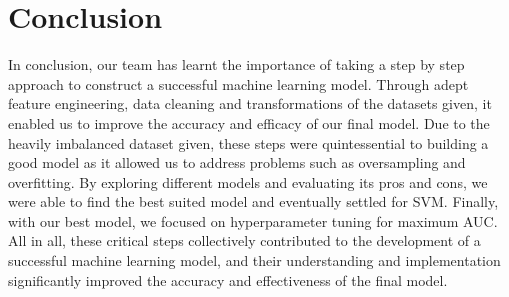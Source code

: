 \documentclass[12pt]{article}
\begin{document}
\section{Conclusion}
In conclusion, our team has learnt the importance of taking a step by step approach to construct a successful machine learning model. Through adept feature engineering, data cleaning and transformations of the datasets given, it enabled us to improve the accuracy and efficacy of our final model. Due to the heavily imbalanced dataset given, these steps were quintessential to building a good model as it allowed us to address problems such as oversampling and overfitting. By exploring different models and evaluating its pros and cons, we were able to find the best suited model and eventually settled for SVM. Finally, with our best model, we focused on hyperparameter tuning for maximum AUC. All in all, these critical steps collectively contributed to the development of a successful machine learning model, and their understanding and implementation significantly improved the accuracy and effectiveness of the final model.



% 
% 
% 
% 
% 

\pagebreak


\end{document}
